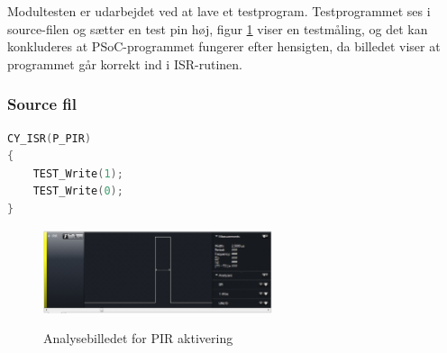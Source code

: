Modultesten er udarbejdet ved at lave et testprogram. Testprogrammet ses i source-filen og sætter en test pin høj, figur \ref{lab:test_maaling} viser en testmåling, og det kan konkluderes at PSoC-programmet fungerer efter hensigten, da billedet viser at programmet går korrekt ind i ISR-rutinen.
  


\subsubsection*{Source fil}
\begin{lstlisting}[language=C]
CY_ISR(P_PIR)
{
    TEST_Write(1);
    TEST_Write(0); 
}
\end{lstlisting}


\begin{figure}[H]
\centering
{\includegraphics[width=0.60\textwidth]{filer/modultest/billeder/pir_testmaaling}}
\caption{Analysebilledet for PIR aktivering}
\label{lab:test_maaling}
\end{figure}

